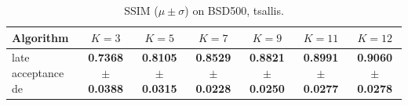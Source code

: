 \begin{table}[htbp]
\centering
\caption{SSIM ($\mu \pm \sigma$) on BSD500, tsallis.}
\label{tab:exp1-tsallis-ssim}
\begin{tabular}{lcccccc}
\toprule
Algorithm & $K=3$ & $K=5$ & $K=7$ & $K=9$ & $K=11$ & $K=12$ \\
\midrule
late acceptance de & \textbf{0.7368 $\pm$ 0.0388} & \textbf{0.8105 $\pm$ 0.0315} & \textbf{0.8529 $\pm$ 0.0228} & \textbf{0.8821 $\pm$ 0.0250} & \textbf{0.8991 $\pm$ 0.0277} & \textbf{0.9060 $\pm$ 0.0278} \\
\bottomrule
\end{tabular}
\end{table}